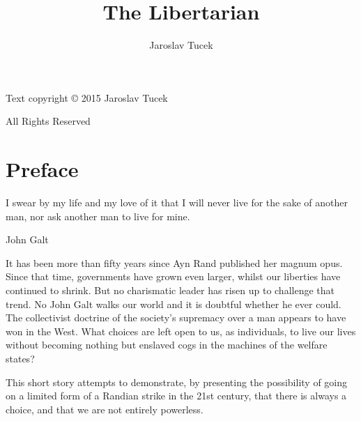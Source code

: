 \title{The Libertarian}
\author{Jaroslav Tucek}
\date{}

\newcommand{\makecopyright}{
	\clearpage
	\begin{center}
	Text copyright \copyright{} 2015 Jaroslav Tucek

	All Rights Reserved
	\end{center}
	\vfill
	\clearpage
}

\usepackage{graphicx}
\usepackage{epigraph}
\usepackage[utf8]{inputenc}
\usepackage[T1]{fontenc}
\usepackage{hyperref}
\usepackage[ngerman,english]{babel}

\hypersetup{
	colorlinks,
	citecolor=black,
	filecolor=black,
	linkcolor=black,
	urlcolor=black
}




\frontmatter

\makecover
\maketitle
\makecopyright
\tableofcontents

\mainmatter

\chapter*{Preface}

\epigraph{I swear by my life and my love of it that I will never live for the sake of another man, nor ask another man to live for mine.}{John Galt}

\firstparagraph

It has been more than fifty years since Ayn Rand published her magnum opus. Since that time, governments have grown even larger, whilst our liberties have continued to shrink. But no charismatic leader has risen up to challenge that trend. No John Galt walks our world and it is doubtful whether he ever could. The collectivist doctrine of the society's supremacy over a man appears to have won in the West. What choices are left open to us, as individuals, to live our lives without becoming nothing but enslaved cogs in the machines of the welfare states?

This short story attempts to demonstrate, by presenting the possibility of going on a limited form of a Randian strike in the 21st century, that there is always a choice, and that we are not entirely powerless.

